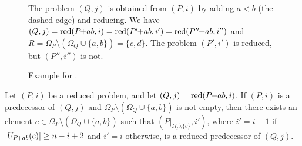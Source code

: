 \documentclass[a4paper,UKenglish,cleveref, autoref, thm-restate]{lipics-v2021}
\newcommand{\pchild}[3]{{#1}\kern-1pt{+}{#2}{#3}}
\newcommand{\reduced}[1]{\operatorname{red}#1}
\newcommand{\greater}[2]{U_{#1}(#2)}
\begin{document}
\begin{figure}[t]
{}

{\small
The problem $(Q, j)$ is obtained from $(P, i)$ by adding $a < b$ (the dashed edge) and reducing.
We have $(Q, j) = \reduced(\pchild{P}{a}{b}, i) = \reduced(\pchild{P'}{a}{b}, i') = \reduced(\pchild{P''}{a}{b}, i'')$ and $R = \Omega_P \setminus (\Omega_Q \cup \{a, b\}) = \{c, d\}$.
The problem $(P', i')$ is reduced, but $(P'', i'')$ is not.
}

  \caption{
    Example for .
  }
  \label{fig:lemma_viz_example}
\end{figure}

\begin{lemma} \label{lemma:remove_elements_iteratively}
  Let $(P, i)$ be a reduced problem, and let $(Q, j) = \reduced{(\pchild{P}{a}{b}, i)}$.
  If $(P, i)$ is a predecessor of $(Q, j)$ and $\Omega_P \setminus (\Omega_Q \cup \{a, b\})$ is not empty, then there exists an element $c \in \Omega_P \setminus (\Omega_Q \cup \{a, b\})$ such that $(P|_{\Omega_P \setminus \{c\}}, i')$, where $i' = i - 1$ if $|\greater{\pchild{P}{a}{b}}{c}| \ge n - i + 2$ and $i' = i$ otherwise, is a reduced predecessor of $(Q, j)$.
\end{lemma}
\end{document}
